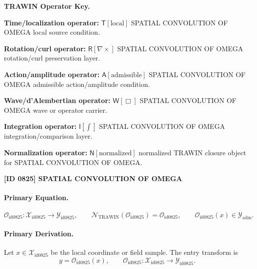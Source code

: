 \par\vspace{0.45\baselineskip}
\noindent\begin{minipage}[t]{\linewidth}
\begingroup
\small
\raggedright
\textbf{TRAWIN Operator Key.}\par
\noindent\textbf{Time/localization operator:} $\mathsf{T}\!\left[\mathrm{local}\right]$ SPATIAL CONVOLUTION OF OMEGA local source condition.\par
\noindent\textbf{Rotation/curl operator:} $\mathsf{R}\!\left[\nabla\times\right]$ SPATIAL CONVOLUTION OF OMEGA rotation/curl preservation layer.\par
\noindent\textbf{Action/amplitude operator:} $\mathsf{A}\!\left[\mathrm{admissible}\right]$ SPATIAL CONVOLUTION OF OMEGA admissible action/amplitude condition.\par
\noindent\textbf{Wave/d'Alembertian operator:} $\mathsf{W}\!\left[\Box\right]$ SPATIAL CONVOLUTION OF OMEGA wave or operator carrier.\par
\noindent\textbf{Integration operator:} $\mathsf{I}\!\left[\int\right]$ SPATIAL CONVOLUTION OF OMEGA integration/comparison layer.\par
\noindent\textbf{Normalization operator:} $\mathsf{N}\!\left[\mathrm{normalized}\right]$ normalized TRAWIN closure object for SPATIAL CONVOLUTION OF OMEGA.\par
\endgroup
\end{minipage}

\clearpage
\noindent\textbf{[ID 0825] SPATIAL CONVOLUTION OF OMEGA}\par
\vspace{0.35em}
\paragraph{Primary Equation.}
\[
\mathcal{O}_{\mathrm{id0825}}:\mathcal{X}_{\mathrm{id0825}}\longrightarrow \mathcal{Y}_{\mathrm{id0825}},\qquad
\mathcal{N}_{\mathrm{TRAWIN}}(\mathcal{O}_{\mathrm{id0825}})=\mathcal{O}_{\mathrm{id0825}},\qquad
\mathcal{O}_{\mathrm{id0825}}(x)\in\mathcal{Y}_{\mathrm{adm}}.
\]

\paragraph{Primary Derivation.} Let $x\in \mathcal{X}_{\mathrm{id0825}}$ be the local coordinate or field sample.  The entry transform is\[
y=\mathcal{O}_{\mathrm{id0825}}(x),\qquad \mathcal{O}_{\mathrm{id0825}}:\mathcal{X}_{\mathrm{id0825}}\longrightarrow \mathcal{Y}_{\mathrm{id0825}}.
\]

